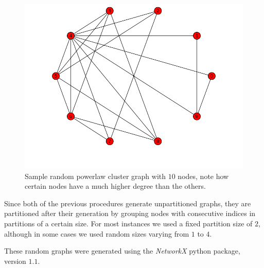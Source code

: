 \begin{itemize}
{\begin{figure}
\begin{center}
	    \includegraphics[scale=0.5]{imgs/hk-10-04.png}
	  \end{center}
		\label{results:graph:binomial}
		\caption{Sample random powerlaw cluster graph with $10$ nodes, note how certain nodes have a much higher degree than the others.}
	\end{figure}
	} 
\end{itemize}

Since both of the previous procedures generate unpartitioned graphs, they are partitioned after their generation by grouping nodes with consecutive indices in partitions of a certain size. For most instances we used a fixed partition size of $2$, although in some cases we used random sizes varying from $1$ to $4$.

These random graphs were generated using the \textit{NetworkX} python package\cite{networkx}, version $1.1$.